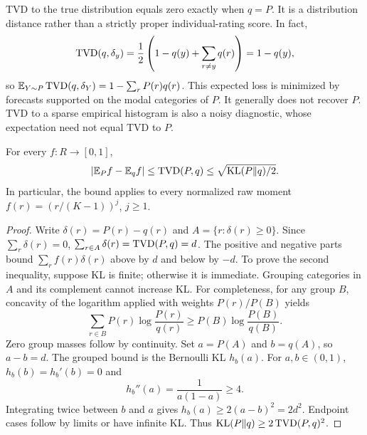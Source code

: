 TVD to the true distribution equals zero exactly when $q=P$.
It is a distribution distance rather than a strictly proper individual-rating score.
In fact,
\[
 \operatorname{TVD}(q,\delta_y)=\frac12\left(1-q(y)+\sum_{r\ne y}q(r)\right)=1-q(y),
\]
so $\mathbb{E}_{Y\sim P}\operatorname{TVD}(q,\delta_Y)=1-\sum_rP(r)q(r)$.
This expected loss is minimized by forecasts supported on the modal categories of $P$.
It generally does not recover $P$.
TVD to a sparse empirical histogram is also a noisy diagnostic, whose expectation need not equal TVD to $P$.

\begin{proposition}\label{prop:pinsker}
For every $f:R\to[0,1]$,
\begin{equation}\label{eq:momentbound}
 |\mathbb{E}_P f-\mathbb{E}_q f|\le\operatorname{TVD}(P,q)\le\sqrt{\operatorname{KL}(P\Vert q)/2}.
\end{equation}
In particular, the bound applies to every normalized raw moment $f(r)=(r/(K-1))^j$, $j\ge1$.
\end{proposition}
\begin{proof}
Write $\delta(r)=P(r)-q(r)$ and $A=\{r:\delta(r)\ge0\}$.
Since $\sum_r\delta(r)=0$, $\sum_{r\in A}\delta(r)=\operatorname{TVD}(P,q)=d$.
The positive and negative parts bound $\sum_r f(r)\delta(r)$ above by $d$ and below by $-d$.
To prove the second inequality, suppose KL is finite; otherwise it is immediate.
Grouping categories in $A$ and its complement cannot increase KL.
For completeness, for any group $B$, concavity of the logarithm applied with weights $P(r)/P(B)$ yields
\[
 \sum_{r\in B}P(r)\log\frac{P(r)}{q(r)}\ge P(B)\log\frac{P(B)}{q(B)}.
\]
Zero group masses follow by continuity.
Set $a=P(A)$ and $b=q(A)$, so $a-b=d$.
The grouped bound is the Bernoulli KL $h_b(a)$.
For $a,b\in(0,1)$, $h_b(b)=h_b'(b)=0$ and
\[
 h_b''(a)=\frac1{a(1-a)}\ge4.
\]
Integrating twice between $b$ and $a$ gives $h_b(a)\ge2(a-b)^2=2d^2$.
Endpoint cases follow by limits or have infinite KL.
Thus $\operatorname{KL}(P\Vert q)\ge2\operatorname{TVD}(P,q)^2$.
\end{proof}

